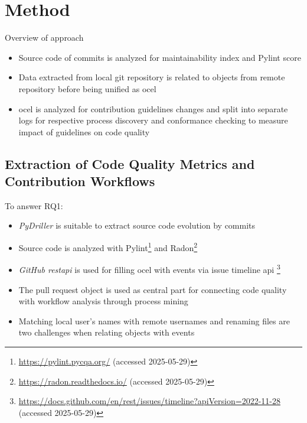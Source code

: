 \chapter{Method}
\label{chap:method}
Overview of approach
\begin{itemize}
	\item Source code of commits is analyzed for maintainability index and Pylint score
	\item Data extracted from local git repository is related to objects from remote repository before being unified as \ac{ocel}
	\item \ac{ocel} is analyzed for contribution guidelines changes and split into separate logs for respective process discovery and conformance checking to measure impact of guidelines on code quality
\end{itemize}

\section{Extraction of Code Quality Metrics and Contribution Workflows}
To answer RQ1:
\begin{itemize}

	\item \emph{PyDriller} is suitable to extract source code evolution by commits
	\item Source code is analyzed with Pylint\footnote{\url{https://pylint.pycqa.org/} (accessed 2025-05-29)} and Radon\footnote{\url{https://radon.readthedocs.io/} (accessed 2025-05-29)}
	\item \emph{GitHub \ac{restapi}} is used for filling \ac{ocel} with events via issue timeline \ac{api} \footnote{\url{https://docs.github.com/en/rest/issues/timeline?apiVersion=2022-11-28} (accessed 2025-05-29)}
	\item The pull request object is used as central part for connecting code quality with workflow analysis through process mining
	\item Matching local user's names with remote usernames and renaming files are two challenges when relating objects with events
\end{itemize}

